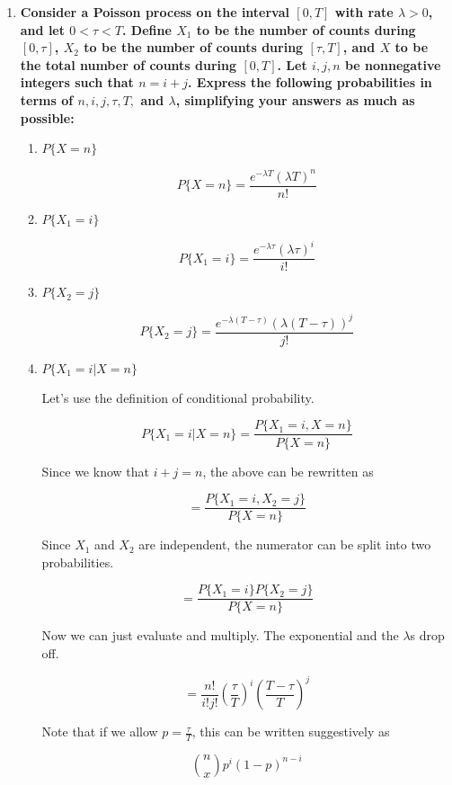 \documentclass{article}
\begin{document}
\begin{enumerate}[label=(\alph*)]
    \item \textbf{Consider a Poisson process on the interval $[0, T]$ with rate $\lambda > 0$, and let $0 < \tau < T$. Define $X_1$ to be the number of counts during $[0, \tau]$, $X_2$ to be the number of counts during $[\tau, T]$, and $X$ to be the total number of counts during $[0, T]$. Let $i, j, n$ be nonnegative integers such that $n = i + j$. Express the following probabilities in terms of $n, i, j, \tau, T, $ and $\lambda$, simplifying your answers as much as possible:}

    \begin{enumerate}[label=(\roman*)]
        \item \textbf{$P\{X = n\}$}

        $$P\{X = n\} = \boxed{\frac{e^{-\lambda T}(\lambda T)^n}{n!}}$$
        
        \item \textbf{$P\{X_1 = i\}$}

        $$P\{X_1 = i\} = \boxed{\frac{e^{-\lambda \tau}(\lambda \tau)^i}{i!}}$$
        
        \item \textbf{$P\{X_2 = j\}$}

        $$P\{X_2 = j\} = \boxed{\frac{e^{-\lambda (T - \tau)}(\lambda (T - \tau))^j}{j!}}$$
        
        \item \textbf{$P\{X_1 = i \vert X = n\}$}

        Let's use the definition of conditional probability.

        $$P\{X_1 = i \vert X = n\} = \frac{P\{X_1 = i, X = n\}}{P\{X = n\}}$$

        Since we know that $i + j = n$, the above can be rewritten as

        $$= \frac{P\{X_1 = i, X_2 = j\}}{P\{X = n\}}$$

        Since $X_1$ and $X_2$ are independent, the numerator can be split into two probabilities.

        $$= \frac{P\{X_1 = i\} P\{X_2 = j\}}{P\{X = n\}}$$

        Now we can just evaluate and multiply. The exponential and the $\lambda$s drop off.

        $$= \boxed{\frac{n!}{i!j!} \left( \frac{\tau}{T} \right)^i \left(\frac{T - \tau}{T} \right)^j}$$

        Note that if we allow $p = \frac{\tau}{T}$, this can be written suggestively as

        $${n \choose x} p^i (1 - p)^{n - i}$$


\end{enumerate}
\end{enumerate}
\end{document}
